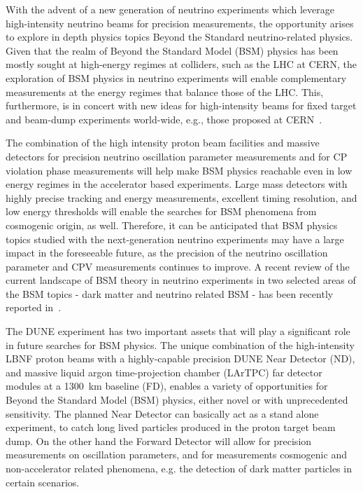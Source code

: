 
With the advent of a new generation of neutrino experiments which leverage high-intensity neutrino beams for precision measurements, 
the opportunity arises to explore in depth physics topics Beyond the Standard neutrino-related physics. 
Given that the realm of Beyond the Standard Model (BSM) physics  has been mostly sought at high-energy regimes at colliders, 
such as the LHC at CERN, the exploration of BSM physics in neutrino experiments will enable complementary 
measurements at the energy regimes that balance those  of the LHC. 
This, furthermore, is  in concert with new ideas for high-intensity beams for fixed target and beam-dump experiments 
world-wide, e.g., those proposed at CERN~\cite{Beacham:2019nyx}.

The combination of the high intensity proton beam facilities and massive detectors for precision neutrino oscillation parameter measurements and for CP violation phase measurements will help make BSM physics reachable even in low energy regimes in the accelerator based experiments.
Large mass detectors with highly precise tracking and energy measurements, excellent timing resolution, and low energy thresholds will enable the searches for BSM phenomena from cosmogenic origin, as well.
Therefore, it can be anticipated that BSM physics topics studied with the next-generation neutrino 
experiments may have a large impact in the foreseeable future, 
as the precision of the neutrino oscillation parameter and CPV measurements continues to improve.
A recent review of the current landscape of BSM theory in neutrino experiments in two selected areas of the BSM topics - dark matter and neutrino related BSM - has been recently reported in~\cite{Arguelles:2019xgp}.

The DUNE experiment has two important assets that will play a significant role in 
future searches for BSM physics.
The unique combination of the high-intensity LBNF proton beams with a highly-capable precision
 DUNE Near Detector (ND), and massive liquid argon time-projection chamber (LArTPC) far detector modules at a \SI{1300}{\km} baseline (FD), enables a variety of opportunities for Beyond the Standard Model (BSM) physics, either novel or with unprecedented sensitivity.
The planned Near Detector can basically act as a stand alone experiment,
to catch long lived particles produced in the proton target beam dump. On the other hand the Forward Detector
will allow for precision measurements on oscillation parameters, and for measurements cosmogenic and
 non-accelerator related phenomena, e.g. the detection of dark matter particles in certain scenarios.

